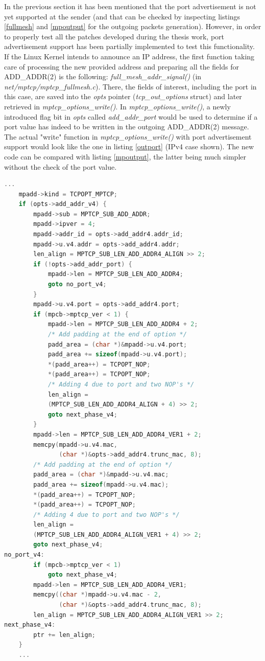 In the previous section it has been mentioned that the port advertisement is not yet supported at the sender (and that can be checked by inspecting listings \ref{fullmesh} and \ref{mpoutput} for the outgoing packets generation). 
However, in order to properly test all the patches developed during the thesis work, port advertisement support has been partially implemented to test this functionality. If the Linux Kernel intends to announce an IP address, the first function taking care of processing the new provided address and preparing all the fields for ADD\_ADDR(2) is the following: \textit{full\_mesh\_addr\_signal()} (in \textit{net/mptcp/mptcp\_fullmesh.c}). There, the fields of interest, including the port in this case, are saved into the \textit{opts} pointer (\textit{tcp\_out\_options} struct) and later retrieved in \textit{mptcp\_options\_write()}. In \textit{mptcp\_options\_write()}, a newly introduced flag bit in \textit{opts} called \textit{add\_addr\_port} would be used to determine if a port value has indeed to be written in the outgoing ADD\_ADDR(2) message. The actual "write" function in \textit{mptcp\_options\_write()} with port advertisement support would look like the one in listing \ref{outport} (IPv4 case shown). The new code can be compared with listing \ref{mpoutput}, the latter being much simpler without the check of the port value.

\begin{lstlisting}[language=c, caption=\textit{Code to write the outgoing ADD\_ADDR(2) packet, with added support for the port value}, label=outport]
	...
	mpadd->kind = TCPOPT_MPTCP;
	if (opts->add_addr_v4) {
		mpadd->sub = MPTCP_SUB_ADD_ADDR;
		mpadd->ipver = 4;
		mpadd->addr_id = opts->add_addr4.addr_id;
		mpadd->u.v4.addr = opts->add_addr4.addr;
		len_align = MPTCP_SUB_LEN_ADD_ADDR4_ALIGN >> 2;
		if (!opts->add_addr_port) {
			mpadd->len = MPTCP_SUB_LEN_ADD_ADDR4;
			goto no_port_v4;
		}
		mpadd->u.v4.port = opts->add_addr4.port;
		if (mpcb->mptcp_ver < 1) {
			mpadd->len = MPTCP_SUB_LEN_ADD_ADDR4 + 2;
			/* Add padding at the end of option */
			padd_area = (char *)&mpadd->u.v4.port;
			padd_area += sizeof(mpadd->u.v4.port);
			*(padd_area++) = TCPOPT_NOP;
			*(padd_area++) = TCPOPT_NOP;
			/* Adding 4 due to port and two NOP's */
			len_align =
			(MPTCP_SUB_LEN_ADD_ADDR4_ALIGN + 4) >> 2;
			goto next_phase_v4;
		}
		mpadd->len = MPTCP_SUB_LEN_ADD_ADDR4_VER1 + 2;
		memcpy(mpadd->u.v4.mac,
		       (char *)&opts->add_addr4.trunc_mac, 8);
		/* Add padding at the end of option */
		padd_area = (char *)&mpadd->u.v4.mac;
		padd_area += sizeof(mpadd->u.v4.mac);
		*(padd_area++) = TCPOPT_NOP;
		*(padd_area++) = TCPOPT_NOP;
		/* Adding 4 due to port and two NOP's */
		len_align =
		(MPTCP_SUB_LEN_ADD_ADDR4_ALIGN_VER1 + 4) >> 2;
		goto next_phase_v4;
no_port_v4:
		if (mpcb->mptcp_ver < 1)
			goto next_phase_v4;
		mpadd->len = MPTCP_SUB_LEN_ADD_ADDR4_VER1;
		memcpy((char *)mpadd->u.v4.mac - 2,
		       (char *)&opts->add_addr4.trunc_mac, 8);
		len_align = MPTCP_SUB_LEN_ADD_ADDR4_ALIGN_VER1 >> 2;
next_phase_v4:
		ptr += len_align;
	}
	...
\end{lstlisting}


